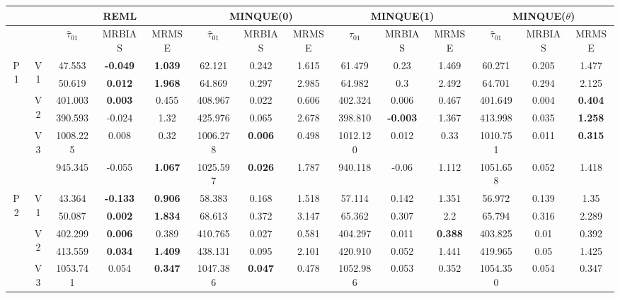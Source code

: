 \documentclass[12pt,a4paper]{article}
\begin{document}
\begin{sidewaystable}[ht]
\centering
{\footnotesize
\begin{tabular}{cc|ccc|ccc|ccc|ccc|}
   & & \multicolumn{3}{c|}{REML}&\multicolumn{3}{c|}{MINQUE(0)}&\multicolumn{3}{c|}{MINQUE(1)}&\multicolumn{3}{c|}{MINQUE($\theta$)}\\ \hline
 &  & $\hat{\tau}_{01}$ & MRBIAS & MRMSE & $\hat{\tau}_{01}$ & MRBIAS & MRMSE & $\hat{\tau}_{01}$ & MRBIAS & MRMSE & $\hat{\tau}_{01}$ & MRBIAS & MRMSE \\ 
  \hline
\multirow{6}{*}{P1} & \multirow{2}{*}{V1} & 47.553 & \textbf{-0.049} & \textbf{1.039} & 62.121 & 0.242 & 1.615 & 61.479 & 0.23 & 1.469 & 60.271 & 0.205 & 1.477 \\ 
   &  & 50.619 & \textbf{0.012} & \textbf{1.968} & 64.869 & 0.297 & 2.985 & 64.982 & 0.3 & 2.492 & 64.701 & 0.294 & 2.125 \\ 
   & \multirow{2}{*}{V2} & 401.003 & \textbf{0.003} & 0.455 & 408.967 & 0.022 & 0.606 & 402.324 & 0.006 & 0.467 & 401.649 & 0.004 & \textbf{0.404} \\ 
   &  & 390.593 & -0.024 & 1.32 & 425.976 & 0.065 & 2.678 & 398.810 & \textbf{-0.003} & 1.367 & 413.998 & 0.035 & \textbf{1.258} \\ 
   & \multirow{2}{*}{V3} & 1008.225 & 0.008 & 0.32 & 1006.278 & \textbf{0.006} & 0.498 & 1012.120 & 0.012 & 0.33 & 1010.751 & 0.011 & \textbf{0.315} \\ 
   &  & 945.345 & -0.055 & \textbf{1.067} & 1025.597 & \textbf{0.026} & 1.787 & 940.118 & -0.06 & 1.112 & 1051.658 & 0.052 & 1.418 \\ 
   \hline \hline\multirow{6}{*}{P2} & \multirow{2}{*}{V1} & 43.364 & \textbf{-0.133} & \textbf{0.906} & 58.383 & 0.168 & 1.518 & 57.114 & 0.142 & 1.351 & 56.972 & 0.139 & 1.35 \\ 
   &  & 50.087 & \textbf{0.002} & \textbf{1.834} & 68.613 & 0.372 & 3.147 & 65.362 & 0.307 & 2.2 & 65.794 & 0.316 & 2.289 \\ 
   & \multirow{2}{*}{V2} & 402.299 & \textbf{0.006} & 0.389 & 410.765 & 0.027 & 0.581 & 404.297 & 0.011 & \textbf{0.388} & 403.825 & 0.01 & 0.392 \\ 
   &  & 413.559 & \textbf{0.034} & \textbf{1.409} & 438.131 & 0.095 & 2.101 & 420.910 & 0.052 & 1.441 & 419.965 & 0.05 & 1.425 \\ 
   & \multirow{2}{*}{V3} & 1053.741 & 0.054 & \textbf{0.347} & 1047.386 & \textbf{0.047} & 0.478 & 1052.986 & 0.053 & 0.352 & 1054.350 & 0.054 & 0.347 \\ 

\end{tabular}}
\end{sidewaystable}
\end{document}
